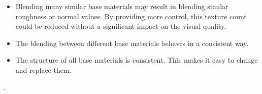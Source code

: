 \begin{description}
\begin{description}
\begin{itemize}
		\end{itemize}
		\item[\performance:]\hfill
		\begin{itemize}
			\item Blending many similar base materials may result in blending similar roughness or normal values. By providing more control, this texture count could be reduced without a significant impact on the visual quality. 
		\end{itemize}
		\item[\pipeline:]\hfill
		\begin{itemize}
			\item The blending between different base materials behaves in a consistent way. 
			\item The structure of all base materials is consistent. This makes it easy to change and replace them.  
		\end{itemize}
	\end{description}
\end{description}



. 
\subsubsection{\patComplexitMaterialModulation}\label{\patComplexitMaterialModulation}

